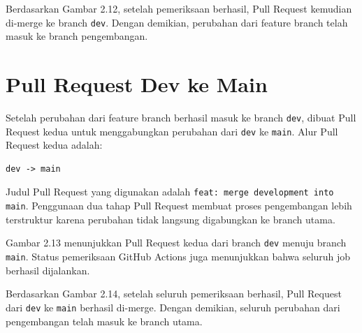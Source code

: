 \documentclass[a4paper,oneside,11pt]{book}
\begin{document}

Berdasarkan Gambar 2.12, setelah pemeriksaan berhasil, Pull Request kemudian di-merge ke branch \texttt{dev}. Dengan demikian, perubahan dari feature branch telah masuk ke branch pengembangan.

\section{Pull Request Dev ke Main}

Setelah perubahan dari feature branch berhasil masuk ke branch \texttt{dev}, dibuat Pull Request kedua untuk menggabungkan perubahan dari \texttt{dev} ke \texttt{main}. Alur Pull Request kedua adalah:

\begin{lstlisting}
dev -> main
\end{lstlisting}

Judul Pull Request yang digunakan adalah \texttt{feat: merge development into main}. Penggunaan dua tahap Pull Request membuat proses pengembangan lebih terstruktur karena perubahan tidak langsung digabungkan ke branch utama.


Gambar 2.13 menunjukkan Pull Request kedua dari branch \texttt{dev} menuju branch \texttt{main}. Status pemeriksaan GitHub Actions juga menunjukkan bahwa seluruh job berhasil dijalankan.


Berdasarkan Gambar 2.14, setelah seluruh pemeriksaan berhasil, Pull Request dari \texttt{dev} ke \texttt{main} berhasil di-merge. Dengan demikian, seluruh perubahan dari pengembangan telah masuk ke branch utama.
\end{document}
